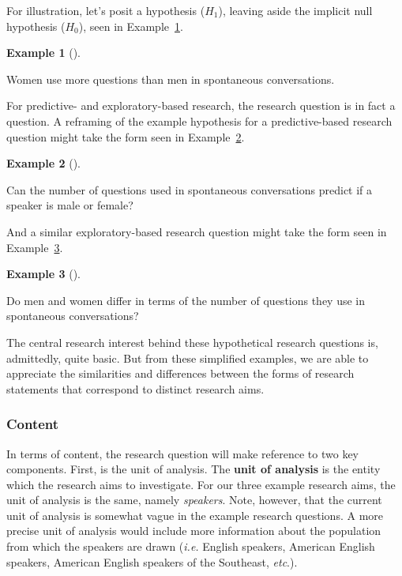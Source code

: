 \documentclass[
  letterpaper,
  DIV=11,
  numbers=noendperiod]{scrreprt}
\theoremstyle{definition}
\newtheorem{example}{Example}[chapter]
\theoremstyle{remark}
\begin{document}
For illustration, let's posit a hypothesis (\(H_1\)), leaving aside the
implicit null hypothesis (\(H_0\)), seen in
Example~\ref{exm-fr-form-infer}.

\begin{example}[]\protect\hypertarget{exm-fr-form-infer}{}\label{exm-fr-form-infer}

Women use more questions than men in spontaneous conversations.

\end{example}

For predictive- and exploratory-based research, the research question is
in fact a question. A reframing of the example hypothesis for a
predictive-based research question might take the form seen in
Example~\ref{exm-fr-form-pred}.

\begin{example}[]\protect\hypertarget{exm-fr-form-pred}{}\label{exm-fr-form-pred}

Can the number of questions used in spontaneous conversations predict if
a speaker is male or female?

\end{example}

And a similar exploratory-based research question might take the form
seen in Example~\ref{exm-fr-form-exp}.

\begin{example}[]\protect\hypertarget{exm-fr-form-exp}{}\label{exm-fr-form-exp}

Do men and women differ in terms of the number of questions they use in
spontaneous conversations?

\end{example}

The central research interest behind these hypothetical research
questions is, admittedly, quite basic. But from these simplified
examples, we are able to appreciate the similarities and differences
between the forms of research statements that correspond to distinct
research aims.

\subsubsection{Content}\label{sec-fr-question-content}

In terms of content, the research question will make reference to two
key components. First, is the unit of analysis. The \textbf{unit of
analysis} is the entity which the research aims to investigate. For our
three example research aims, the unit of analysis is the same, namely
\emph{speakers}. Note, however, that the current unit of analysis is
somewhat vague in the example research questions. A more precise unit of
analysis would include more information about the population from which
the speakers are drawn (\emph{i.e.} English speakers, American English
speakers, American English speakers of the Southeast, \emph{etc}.).
\end{document}
